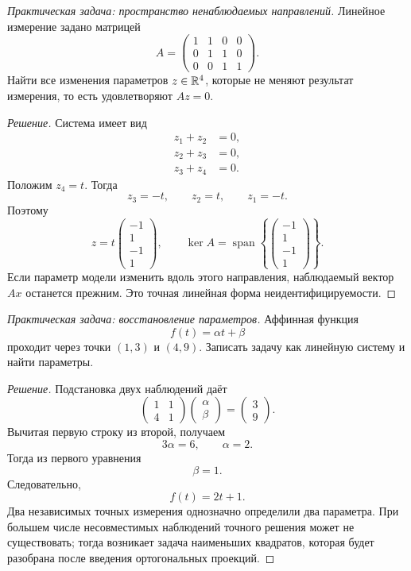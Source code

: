 \begin{problem}
\textit{Практическая задача: пространство ненаблюдаемых направлений.}
Линейное измерение задано матрицей
\[
A=
\begin{pmatrix}
1&1&0&0\\
0&1&1&0\\
0&0&1&1
\end{pmatrix}.
\]
Найти все изменения параметров \(z\in\mathbb{R}^4\), которые не меняют результат измерения, то есть удовлетворяют \(Az=0\).
\end{problem}

\begin{proof}[Решение]
Система имеет вид
\[
\begin{aligned}
z_1+z_2&=0,\\
z_2+z_3&=0,\\
z_3+z_4&=0.
\end{aligned}
\]
Положим \(z_4=t\). Тогда
\[
z_3=-t,
\qquad
z_2=t,
\qquad
z_1=-t.
\]
Поэтому
\[
z=t
\begin{pmatrix}
-1\\1\\-1\\1
\end{pmatrix},
\qquad
\ker A=
\operatorname{span}
\left\{
\begin{pmatrix}
-1\\1\\-1\\1
\end{pmatrix}
\right\}.
\]
Если параметр модели изменить вдоль этого направления, наблюдаемый вектор \(Ax\) останется прежним. Это точная линейная форма неидентифицируемости.
\end{proof}

\begin{problem}
\textit{Практическая задача: восстановление параметров.}
Аффинная функция
\[
f(t)=\alpha t+\beta
\]
проходит через точки \((1,3)\) и \((4,9)\). Записать задачу как линейную систему и найти параметры.
\end{problem}

\begin{proof}[Решение]
Подстановка двух наблюдений даёт
\[
\begin{pmatrix}
1&1\\
4&1
\end{pmatrix}
\begin{pmatrix}
\alpha\\\beta
\end{pmatrix}
=
\begin{pmatrix}
3\\9
\end{pmatrix}.
\]
Вычитая первую строку из второй, получаем
\[
3\alpha=6,
\qquad
\alpha=2.
\]
Тогда из первого уравнения
\[
\beta=1.
\]
Следовательно,
\[
f(t)=2t+1.
\]
Два независимых точных измерения однозначно определили два параметра. При большем числе несовместимых наблюдений точного решения может не существовать; тогда возникает задача наименьших квадратов, которая будет разобрана после введения ортогональных проекций.
\end{proof}


